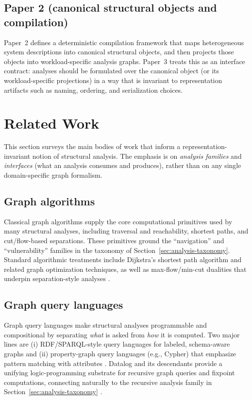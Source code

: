 \documentclass[11pt]{article}
\begin{document}
\subsection{Paper 2 (canonical structural objects and compilation)}
\label{sec:background-paper2}
Paper~2 defines a deterministic compilation framework that maps heterogeneous system descriptions into canonical structural objects, and then projects those objects into workload-specific analysis graphs. Paper~3 treats this as an interface contract: analyses should be formulated over the canonical object (or its workload-specific projections) in a way that is invariant to representation artifacts such as naming, ordering, and serialization choices.

\section{Related Work}
\label{sec:related-work}
This section surveys the main bodies of work that inform a representation-invariant notion of structural analysis. The emphasis is on \emph{analysis families} and \emph{interfaces} (what an analysis consumes and produces), rather than on any single domain-specific graph formalism.

\subsection{Graph algorithms}
Classical graph algorithms supply the core computational primitives used by many structural analyses, including traversal and reachability, shortest paths, and cut/flow-based separations. These primitives ground the ``navigation'' and ``vulnerability'' families in the taxonomy of Section~\ref{sec:analysis-taxonomy}. Standard algorithmic treatments include Dijkstra's shortest path algorithm and related graph optimization techniques, as well as max-flow/min-cut dualities that underpin separation-style analyses \cite{dijkstra1959,ahuja1993}.

\subsection{Graph query languages}
Graph query languages make structural analyses programmable and compositional by separating \emph{what} is asked from \emph{how} it is computed. Two major lines are (i) RDF/SPARQL-style query languages for labeled, schema-aware graphs \cite{sparql2013} and (ii) property-graph query languages (e.g., Cypher) that emphasize pattern matching with attributes \cite{angles2018}. Datalog and its descendants provide a unifying logic-programming substrate for recursive graph queries and fixpoint computations, connecting naturally to the recursive analysis family in Section~\ref{sec:analysis-taxonomy} \cite{ceri1990}.
\end{document}
